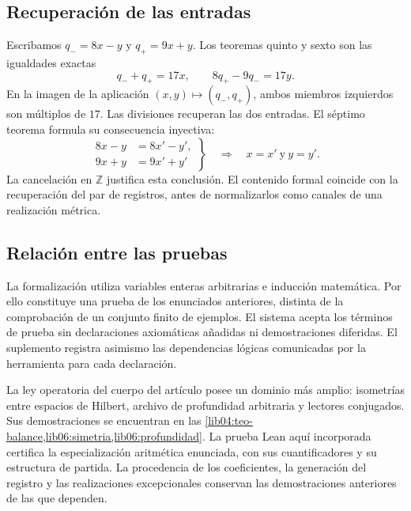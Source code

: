 \subsection*{Recuperación de las entradas}

Escribamos \(q_-=8x-y\) y \(q_+=9x+y\). Los teoremas quinto y sexto
son las igualdades exactas
\[
 q_-+q_+=17x,\qquad 8q_+-9q_-=17y.
\]
En la imagen de la aplicación \((x,y)\mapsto(q_-,q_+)\), ambos miembros
izquierdos son múltiplos de \(17\). Las divisiones recuperan las dos
entradas. El séptimo teorema formula su consecuencia inyectiva:
\[
 \left.
 \begin{aligned}
 8x-y&=8x'-y',\\
 9x+y&=9x'+y'
 \end{aligned}
 \right\}
 \quad\Longrightarrow\quad x=x'\ \text{y}\ y=y'.
\]
La cancelación en \(\mathbb Z\) justifica esta conclusión. El contenido
formal coincide con la recuperación del par de registros, antes de
normalizarlos como canales de una realización métrica.

\subsection*{Relación entre las pruebas}

La formalización utiliza variables enteras arbitrarias e inducción
matemática. Por ello constituye una prueba de los enunciados anteriores,
distinta de la comprobación de un conjunto finito de ejemplos. El sistema
acepta los términos de prueba sin declaraciones axiomáticas añadidas ni
demostraciones diferidas. El suplemento registra asimismo las dependencias
lógicas comunicadas por la herramienta para cada declaración.

La ley operatoria del cuerpo del artículo posee un dominio más amplio:
isometrías entre espacios de Hilbert, archivo de profundidad arbitraria y
lectores conjugados. Sus demostraciones se encuentran en las
\cref{lib04:teo-balance,lib06:simetria,lib06:profundidad}. La prueba Lean
aquí incorporada certifica la especialización aritmética enunciada, con
sus cuantificadores y su estructura de partida. La procedencia de los
coeficientes, la generación del registro y las realizaciones excepcionales
conservan las demostraciones anteriores de las que dependen.
